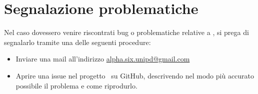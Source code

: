 \section{Segnalazione problematiche}\label{segnalazione}

Nel caso dovessero venire riscontrati bug o problematiche relative a \progetto, si prega di segnalarlo tramite una delle seguenti procedure:
\begin{itemize}
    \item Inviare una mail all'indirizzo \href{mailto:alpha.six.unipd@gmail.com}{alpha.six.unipd@gmail.com}
    \item Aprire una issue nel progetto \progetto\ su GitHub, descrivendo nel modo più accurato possibile il problema e come riprodurlo.
\end{itemize}
